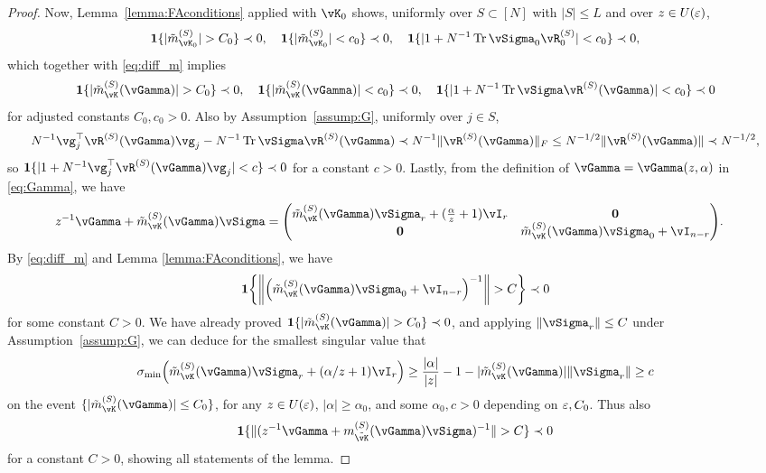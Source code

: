 \begin{proof}
Now, Lemma~\ref{lemma:FAconditions} applied with $\vK_0$ shows, uniformly over $S
\subset [N]$ with $|S| \leq L$ and over $z \in U(\varepsilon)$,
\[\bI\{|\tilde m_{\vK_0}^{(S)}|>C_0\} \prec 0, \quad
	\bI\{|\tilde m_{\vK_0}^{(S)}|<c_0\} \prec 0, \quad
\bI\{|1+N^{-1}\Tr \vSigma_0\vR_0^{(S)}|<c_0\} \prec 0,\]
which together with \eqref{eq:diff_m} implies
	\[\bI\{|\tilde m_{\vK}^{(S)}(\vGamma)|>C_0\} \prec 0, \quad
	\bI\{|\tilde m_{\vK}^{(S)}(\vGamma)|<c_0\} \prec 0, \quad
\bI\{|1+N^{-1}\Tr \vSigma\vR^{(S)}(\vGamma)|<c_0\} \prec 0\]
for adjusted constants $C_0,c_0>0$.
Also by Assumption~\ref{assump:G}, uniformly over $j \in S$,
	\begin{equation}\label{eq:concnetr_g_i}
	N^{-1}\vg_j^\top \vR^{(S)}(\vGamma)\vg_j-N^{-1}\Tr
\vSigma\vR^{(S)}(\vGamma)\prec N^{-1}\|\vR^{(S)}(\vGamma)\|_F \leq
N^{-1/2}\|\vR^{(S)}(\vGamma)\| \prec N^{-1/2},
	\end{equation}
	so $\bI\{|1+N^{-1}\vg_j^\top \vR^{(S)}(\vGamma) \vg_j|<c\} \prec 0$
for a constant $c>0$.
Lastly, from the definition of $\vGamma=\vGamma(z,\alpha)$ in \eqref{eq:Gamma}, we have
	\begin{align}
	    z^{-1}\vGamma+\tilde m_{\vK}^{(S)}(\vGamma)\vSigma&= \begin{pmatrix}
		\tilde m_{\vK}^{(S)}(\vGamma)\vSigma_r+(\frac{\alpha}{z}+1)\vI_r& \mathbf{0}\\
		\mathbf{0} & \tilde m_{\vK}^{(S)}(\vGamma)\vSigma_0+\vI_{n-r}\label{eq:decomp_gamma+sigma}
	\end{pmatrix}.
	\end{align}
By \eqref{eq:diff_m} and Lemma \ref{lemma:FAconditions}, we have
	\begin{equation}\label{eq:lowerblockImSigma}
\bI\left\{\norm{\left(\tilde m_{\vK}^{(S)}(\vGamma)\vSigma_0+\vI_{n-r}\right)^{-1}}>C\right\}\prec 0
\end{equation}
	for some constant $C>0$. We have already proved $\bI\{|\tilde
m_{\vK}^{(S)}(\vGamma)|>C_0\} \prec 0$, and applying
$\|\vSigma_r\|\le C $ under Assumption~\ref{assump:G}, we can deduce for the
smallest singular value that
\begin{equation}\label{eq:sigmamin1plusmSigma}
		\sigma_{\min} \left(\tilde
m_{\vK}^{(S)}(\vGamma)\vSigma_r+(\alpha/z+1)\vI_{r}\right)\ge
\frac{|\alpha|}{|z|}-1-|\tilde m_{\vK}^{(S)}(\vGamma)|\norm{\vSigma_r} \geq
c
\end{equation}
	on the event $\{|\tilde m_{\vK}^{(S)}(\vGamma)|\le C_0\}$,
for any $z \in U(\varepsilon)$, $|\alpha| \geq \alpha_0$, and some $\alpha_0,c>0$
depending on $\varepsilon,C_0$.
Thus also
\begin{equation}\label{eq:extended1plusmSigma}
\bI\{\|(z^{-1}\vGamma+m_{\tilde
\vK}^{(S)}(\vGamma)\vSigma)^{-1}\|>C\} \prec 0
\end{equation}
for a constant $C>0$, showing all statements of the lemma.
\end{proof}

